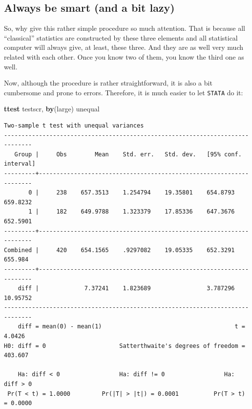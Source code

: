 \documentclass[
]{book}
\newenvironment{Shaded}{\begin{snugshade}}{\end{snugshade}}
\newcommand{\KeywordTok}[1]{\textcolor[rgb]{0.13,0.29,0.53}{\textbf{#1}}}
\newcommand{\NormalTok}[1]{#1}
\begin{document}
\hypertarget{always-be-smart-and-a-bit-lazy}{%
\subsection{Always be smart (and a bit lazy)}\label{always-be-smart-and-a-bit-lazy}}

So, why give this rather simple procedure so much attention. That is because all ``classical'' statistics are constructed by these three elements and all statistical computer will always give, at least, these three. And they are as well very much related with each other. Once you know two of them, you know the third one as well.

Now, although the procedure is rather straightforward, it is also a bit cumbersome and prone to errors. Therefore, it is much easier to let \texttt{STATA} do it:

\begin{Shaded}
\begin{Highlighting}[]
\KeywordTok{ttest}\NormalTok{ testscr, }\KeywordTok{by}\NormalTok{(large) unequal}
\end{Highlighting}
\end{Shaded}

\begin{verbatim}
Two-sample t test with unequal variances
------------------------------------------------------------------------------
   Group |     Obs        Mean    Std. err.   Std. dev.   [95% conf. interval]
---------+--------------------------------------------------------------------
       0 |     238    657.3513    1.254794    19.35801    654.8793    659.8232
       1 |     182    649.9788    1.323379    17.85336    647.3676    652.5901
---------+--------------------------------------------------------------------
Combined |     420    654.1565    .9297082    19.05335    652.3291     655.984
---------+--------------------------------------------------------------------
    diff |             7.37241    1.823689                3.787296    10.95752
------------------------------------------------------------------------------
    diff = mean(0) - mean(1)                                      t =   4.0426
H0: diff = 0                     Satterthwaite's degrees of freedom =  403.607

    Ha: diff < 0                 Ha: diff != 0                 Ha: diff > 0
 Pr(T < t) = 1.0000         Pr(|T| > |t|) = 0.0001          Pr(T > t) = 0.0000
\end{verbatim}
\end{document}
